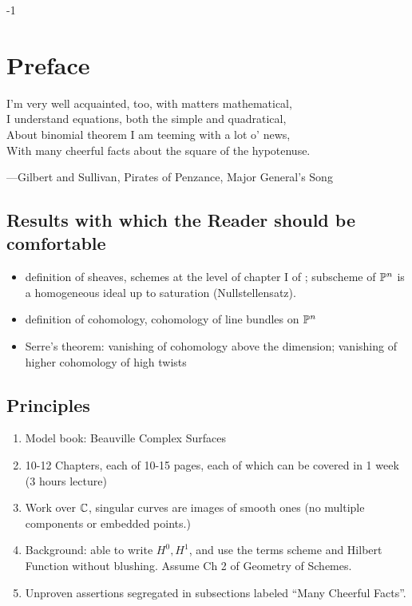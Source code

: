 

\setcounter{chapter} {-1}
\chapter{Preface}

I'm very well acquainted, too, with matters mathematical,\\
I understand equations, both the simple and quadratical,\\
About binomial theorem I am teeming with a lot o' news,\\
With many cheerful facts about the square of the hypotenuse.

---Gilbert and Sullivan, Pirates of Penzance, Major General's Song

\section{Results with which the Reader should be comfortable}

\begin{itemize}
\item definition of sheaves, schemes at the level of chapter I of \cite{GeomSchemes}; subscheme of ${\mathbb P}^{n}$ is a homogeneous ideal up to saturation (Nullstellensatz).
\item definition of cohomology, cohomology of line bundles on ${\mathbb P}^{n}$
\item Serre's theorem: vanishing of cohomology above the dimension; vanishing of higher cohomology of high twists
\end{itemize}

\section{Principles}
\begin{enumerate}

\item Model book: Beauville Complex Surfaces

\item 10-12 Chapters, each of 10-15 pages, each of which can be covered in 1 week (3 hours lecture)

\item Work over ${\mathbb C}$, singular curves are images of smooth ones (no multiple components or embedded points.)

\item Background: able to write $H^0, H^1$, and use the terms scheme and Hilbert Function  without blushing. Assume Ch 2 of Geometry of Schemes.

\item Unproven assertions segregated in subsections labeled ``Many Cheerful Facts''.
\end{enumerate}



